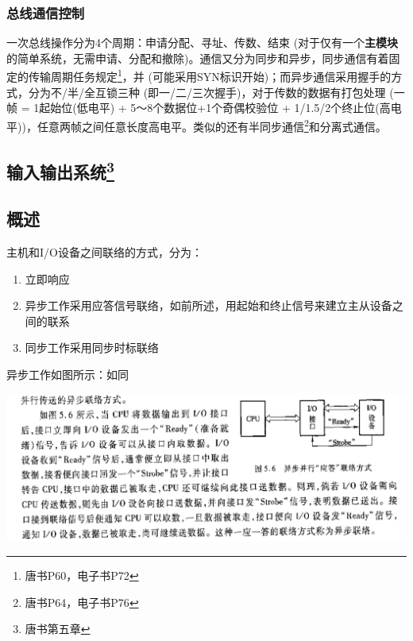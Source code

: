\documentclass[]{report}
\begin{document}
			\subsection{总线通信控制}\par
				一次总线操作分为4个周期：申请分配、寻址、传数、结束 (对于仅有一个\textbf{主模块}的简单系统，无需申请、分配和撤除)。通信又分为同步和异步，同步通信有着固定的传输周期任务规定\footnote{唐书P60，电子书P72}，并 (可能采用SYN标识开始)；而异步通信采用握手的方式，分为不/半/全互锁三种 (即一/二/三次握手)，对于传数的数据有打包处理 (一帧 = 1起始位(低电平) + 5～8个数据位+1个奇偶校验位 + 1/1.5/2个终止位(高电平))，任意两帧之间任意长度高电平。类似的还有半同步通信\footnote{唐书P64，电子书P76}和分离式通信。

	\begin{center}
		\chapter[]{输入输出系统\footnote{唐书第五章}}
	\end{center}
		\section{概述}
			主机和I/O设备之间联络的方式，分为：\par
			\begin{enumerate}[label = (\arabic{*})]
				\item 立即响应
				\item 异步工作采用应答信号联络，如前所述，用起始和终止信号来建立主从设备之间的联系
				\item 同步工作采用同步时标联络
			\end{enumerate}
			异步工作如图所示：如同\par
			\includegraphics[scale = 0.25]{../pictures/IO_Contaction.png}\par
\end{document}
